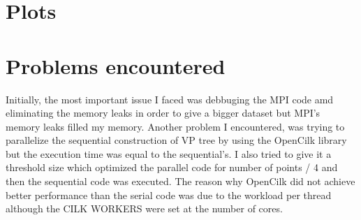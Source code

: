 \documentclass[12pt, a4paper]{report}
\begin{document}
    \section*{Plots}

\section*{Problems encountered}
Initially, the most important issue I faced was debbuging the MPI code amd eliminating the memory leaks in order to give a 
bigger dataset but MPI's memory leaks filled my memory. Another problem I encountered, was trying to parallelize the sequential construction
of VP tree by using the OpenCilk library but the execution time was equal to the sequential's. I also tried to give it a threshold size 
which optimized the parallel code for number of points / 4 and then the sequential code was executed. The reason why OpenCilk did not achieve
better performance than the serial code was due to the workload per thread although the CILK WORKERS were set at the number of cores.    
\end{document}
